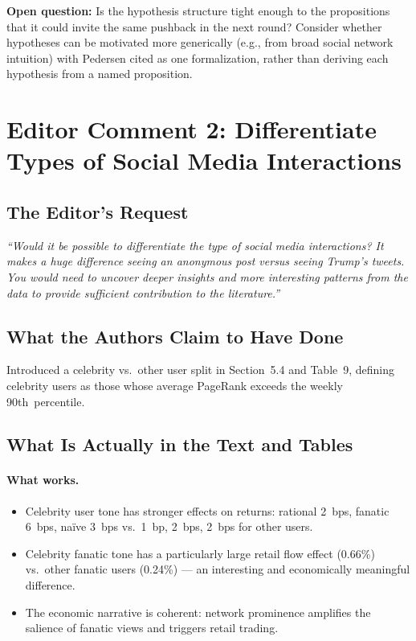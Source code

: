\documentclass[11pt]{article}
\newcommand{\question}[1]{\textcolor{question}{\textbf{Open question:} #1}}
\begin{document}
\question{Is the hypothesis structure tight enough to the propositions that
it could invite the same pushback in the next round? Consider whether
hypotheses can be motivated more generically (e.g., from broad social
network intuition) with Pedersen cited as one formalization, rather than
deriving each hypothesis from a named proposition.}

\newpage
\section{Editor Comment 2: Differentiate Types of Social Media Interactions}

\subsection*{The Editor's Request}
\begin{mdframed}
\textit{``Would it be possible to differentiate the type of social media
interactions? It makes a huge difference seeing an anonymous post versus
seeing Trump's tweets. You would need to uncover deeper insights and more
interesting patterns from the data to provide sufficient contribution to
the literature.''}
\end{mdframed}

\subsection*{What the Authors Claim to Have Done}
Introduced a celebrity vs.\ other user split in Section~5.4 and Table~9,
defining celebrity users as those whose average PageRank exceeds the weekly
90th~percentile.

\subsection*{What Is Actually in the Text and Tables}

\paragraph{What works.}
\begin{itemize}
  \item Celebrity user tone has stronger effects on returns: rational 2~bps,
    fanatic 6~bps, na\"{i}ve 3~bps vs.\ 1~bp, 2~bps, 2~bps for other users.
  \item Celebrity fanatic tone has a particularly large retail flow effect
    (0.66\%) vs.\ other fanatic users (0.24\%) --- an interesting and
    economically meaningful difference.
  \item The economic narrative is coherent: network prominence amplifies
    the salience of fanatic views and triggers retail trading.
\end{itemize}
\end{document}
